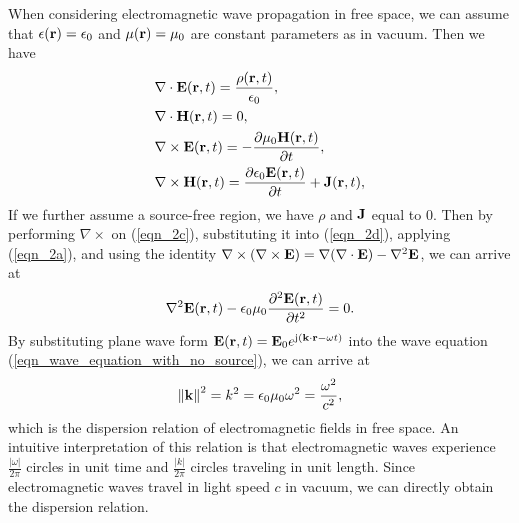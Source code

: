 \documentclass[a4paper,12pt]{article}
\begin{document}
\begin{framed}
{	\quad When considering electromagnetic wave propagation in free space, we can assume that $\epsilon({\bf r}) = \epsilon_0$ and $\mu({\bf r}) = \mu_0$ are constant parameters as in vacuum. Then we have
	\begin{subequations}
		\begin{align} 
			& \nabla \cdot  {\bf E}({\bf r},t) = \frac{\rho({\bf r},t)}{\epsilon_0}, \label{eqn_2a}\\
			& \nabla \cdot {\bf H}({\bf r},t) = 0,\\
			&\nabla \times {\bf E}({\bf r},t) = -\frac{\partial \mu_0 {\bf H}({\bf r},t)}{\partial t}, \label{eqn_2c}\\
			& \nabla \times {\bf H}({\bf r},t) = \frac{ \partial \epsilon_0 {\bf E}({\bf r},t)}{\partial t}+{\bf J}({\bf r},t) \label{eqn_2d}, 
		\end{align}
		\label{eqn_2}
	\end{subequations}
	If we further assume a source-free region, we have $\rho$ and ${\bf J}$ equal to 0. Then by performing $\nabla\times $ on (\ref{eqn_2c}), substituting it into (\ref{eqn_2d}), applying (\ref{eqn_2a}), and using the identity $\nabla\times(\nabla\times {\bf E}) = \nabla(\nabla\cdot {\bf E})-\nabla^2 {\bf E}$, we can arrive at
	\begin{equation}
		\begin{aligned}
			\nabla^2 {\bf E}({\bf r},t) - \epsilon_0 \mu_0 \frac{\partial^2 {\bf E}({\bf r},t)}{\partial t^2} = 0. 
		\end{aligned}
		\label{eqn_wave_equation_with_no_source}
	\end{equation}
	By substituting plane wave form ${\bf E}({\bf r},t) = {\bf E}_0 e^{{\rm j}({\bf k}\cdot {\bf r}-\omega t)}$ into the wave equation (\ref{eqn_wave_equation_with_no_source}), we can arrive at
	\begin{equation}
		\left\|  {\bf k} \right\|^2 = k^2 = \epsilon_0 \mu_0 \omega^2 = \frac{\omega^2}{c^2},
		\label{eqn_dispersion_relation}
	\end{equation}
	which is the dispersion relation of electromagnetic fields in free space. An intuitive interpretation of this relation is that electromagnetic waves experience $\frac{|\omega|}{2\pi}$ circles in unit time and $\frac{|k|}{2\pi}$ circles traveling in unit length. Since electromagnetic waves travel in light speed $c$ in vacuum, we can directly obtain the dispersion relation.
	
}
\end{framed}
\end{document}
